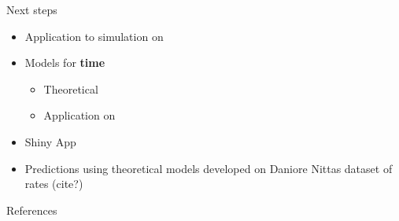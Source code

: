 \documentclass[english]{beamer}\usepackage[]{graphicx}\usepackage[]{xcolor}
\begin{document}
\begin{frame}{Next steps}
\begin{itemize}
\item Application to simulation on \cite{carter2004application}
\item Models for \textbf{time} 
	\begin{itemize}
	\item Theoretical
	\item Application on \cite{carter2004application}
	\end{itemize}
\item Shiny App
\item Predictions using theoretical models developed on Daniore Nittas dataset of rates (cite?)
\end{itemize}

\end{frame}

\begin{frame}{References}
  \small
  

\end{frame}




\end{document}
